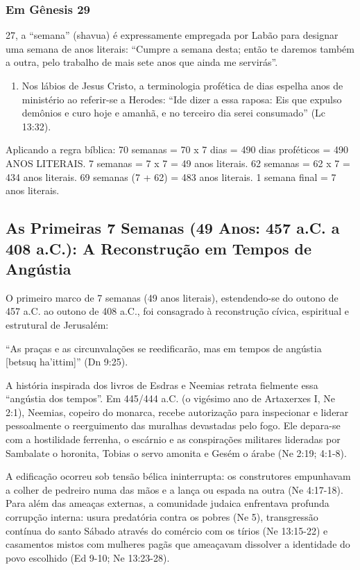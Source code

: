 \documentclass[11pt,a4paper,openany]{book}
\begin{document}
\subsubsection*{Em Gênesis 29}
27, a ``semana'' (shavua) é expressamente empregada por Labão para designar uma semana de anos literais: ``Cumpre a semana desta; então te daremos também a outra, pelo trabalho de mais sete anos que ainda me servirás''.
\begin{enumerate}
  \item Nos lábios de Jesus Cristo, a terminologia profética de dias espelha anos de ministério ao referir-se a Herodes: ``Ide dizer a essa raposa: Eis que expulso demônios e curo hoje e amanhã, e no terceiro dia serei consumado'' (Lc 13:32).
\end{enumerate}


Aplicando a regra bíblica:
70 semanas = 70 x 7 dias = 490 dias proféticos = 490 ANOS LITERAIS.
7 semanas = 7 x 7 = 49 anos literais.
62 semanas = 62 x 7 = 434 anos literais.
69 semanas (7 + 62) = 483 anos literais.
1 semana final = 7 anos literais.



\subsection{As Primeiras 7 Semanas (49 Anos: 457 a.C. a 408 a.C.): A Reconstrução em Tempos de Angústia}


O primeiro marco de 7 semanas (49 anos literais), estendendo-se do outono de 457 a.C. ao outono de 408 a.C., foi consagrado à reconstrução cívica, espiritual e estrutural de Jerusalém:

``As praças e as circunvalações se reedificarão, mas em tempos de angústia [betsuq ha'ittim]'' (Dn 9:25).

A história inspirada dos livros de Esdras e Neemias retrata fielmente essa ``angústia dos tempos''. Em 445/444 a.C. (o vigésimo ano de Artaxerxes I, Ne 2:1), Neemias, copeiro do monarca, recebe autorização para inspecionar e liderar pessoalmente o reerguimento das muralhas devastadas pelo fogo. Ele depara-se com a hostilidade ferrenha, o escárnio e as conspirações militares lideradas por Sambalate o horonita, Tobias o servo amonita e Gesém o árabe (Ne 2:19; 4:1-8).

A edificação ocorreu sob tensão bélica ininterrupta: os construtores empunhavam a colher de pedreiro numa das mãos e a lança ou espada na outra (Ne 4:17-18). Para além das ameaças externas, a comunidade judaica enfrentava profunda corrupção interna: usura predatória contra os pobres (Ne 5), transgressão contínua do santo Sábado através do comércio com os tírios (Ne 13:15-22) e casamentos mistos com mulheres pagãs que ameaçavam dissolver a identidade do povo escolhido (Ed 9-10; Ne 13:23-28).
\end{document}
